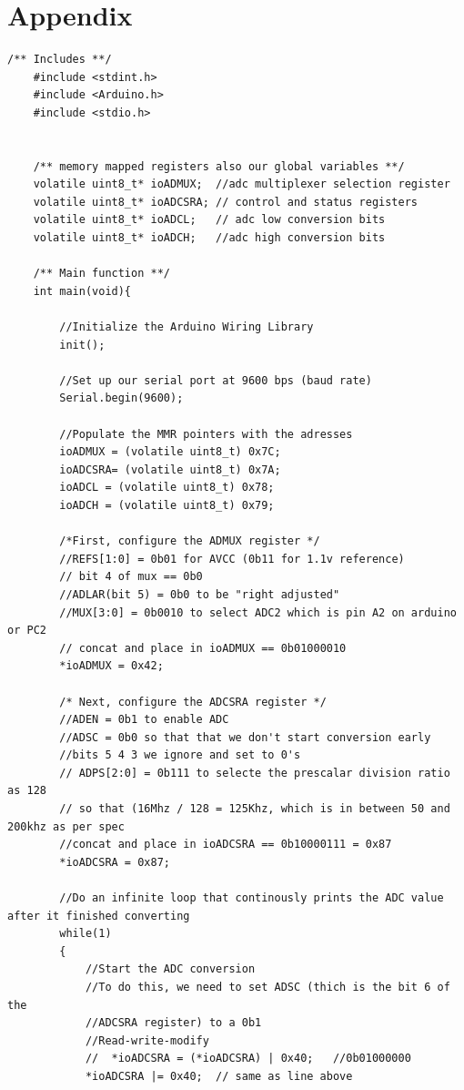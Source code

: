 \documentclass[11pt,pdftex,portrait,letterpaper]{article}
\begin{document}
	\pagebreak
	
	\section{Appendix}
	
	\begin{lstlisting}[caption={Program 1}, label=l:programx]
	/** Includes **/
	#include <stdint.h>
	#include <Arduino.h>
	#include <stdio.h>
	
	
	/** memory mapped registers also our global variables **/
	volatile uint8_t* ioADMUX;  //adc multiplexer selection register
	volatile uint8_t* ioADCSRA; // control and status registers
	volatile uint8_t* ioADCL;   // adc low conversion bits
	volatile uint8_t* ioADCH;   //adc high conversion bits
	
	/** Main function **/
	int main(void){
		
		//Initialize the Arduino Wiring Library
		init();
		
		//Set up our serial port at 9600 bps (baud rate)
		Serial.begin(9600);
		
		//Populate the MMR pointers with the adresses
		ioADMUX = (volatile uint8_t) 0x7C;
		ioADCSRA= (volatile uint8_t) 0x7A;
		ioADCL = (volatile uint8_t) 0x78;
		ioADCH = (volatile uint8_t) 0x79;
		
		/*First, configure the ADMUX register */
		//REFS[1:0] = 0b01 for AVCC (0b11 for 1.1v reference)
		// bit 4 of mux == 0b0
		//ADLAR(bit 5) = 0b0 to be "right adjusted"
		//MUX[3:0] = 0b0010 to select ADC2 which is pin A2 on arduino or PC2
		// concat and place in ioADMUX == 0b01000010
		*ioADMUX = 0x42;
		
		/* Next, configure the ADCSRA register */
		//ADEN = 0b1 to enable ADC
		//ADSC = 0b0 so that that we don't start conversion early
		//bits 5 4 3 we ignore and set to 0's
		// ADPS[2:0] = 0b111 to selecte the prescalar division ratio as 128
		// so that (16Mhz / 128 = 125Khz, which is in between 50 and 200khz as per spec
		//concat and place in ioADCSRA == 0b10000111 = 0x87
		*ioADCSRA = 0x87;
		
		//Do an infinite loop that continously prints the ADC value after it finished converting
		while(1)
		{
			//Start the ADC conversion
			//To do this, we need to set ADSC (thich is the bit 6 of the
			//ADCSRA register) to a 0b1
			//Read-write-modify
			//  *ioADCSRA = (*ioADCSRA) | 0x40;   //0b01000000
			*ioADCSRA |= 0x40;  // same as line above
			

\end{lstlisting}
\end{document}
